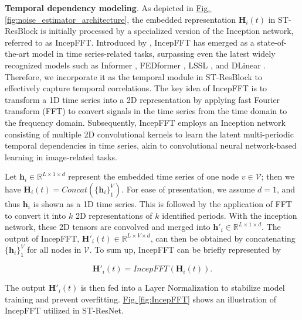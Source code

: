\documentclass[a4paper,fleqn,12pt]{cas-sc}
\begin{document}
\noindent\textbf{Temporal dependency modeling}. As depicted in \hyperref[fig:noise_estimator_architecture]{Fig.\,\ref{fig:noise_estimator_architecture}}, the embedded representation $\boldsymbol{H}_{i}(t)$ in ST-ResBlock is initially processed by a specialized version of the Inception network, referred to as IncepFFT. Introduced by \cite{wu2023timesnet}, IncepFFT has emerged as a state-of-the-art model in time series-related tasks, surpassing even the latest widely recognized models such as Informer \citep{zhou2021informer}, FEDformer \citep{zhou2022fedformer}, LSSL \citep{gu2022efficiently}, and DLinear \citep{zeng2023transformers}. Therefore, we incorporate it as the temporal module in ST-ResBlock to effectively capture temporal correlations. The key idea of IncepFFT is to transform a 1D time series into a 2D representation by applying fast Fourier transform (FFT) to convert signals in the time series from the time domain to the frequency domain. Subsequently, IncepFFT employs an Inception network consisting of multiple 2D convolutional kernels to learn the latent multi-periodic temporal dependencies in time series, akin to convolutional neural network-based learning in image-related tasks.

Let $\boldsymbol{h}_{i}\in\mathbb{R}^{L\times 1\times d}$ represent the embedded time series of one node $v\in \mathcal{V}$; then we have $\boldsymbol{H}_{i}(t) = Concat\left(\{\boldsymbol{h}_{i}\}_{1}^{V}\right)$. For ease of presentation, we assume $d=1$, and thus $\boldsymbol{h}_{i}$ is shown as a 1D time series. This is followed by the application of FFT to convert it into $k$ 2D representations of $k$ identified periods. With the inception network, these 2D tensors are convolved and merged into $\boldsymbol{h}'_{i}\in\mathbb{R}^{L\times 1\times d}$. The output of IncepFFT, $\boldsymbol{H}'_{i}(t)\in\mathbb{R}^{L\times V\times d}$, can then be obtained by concatenating $\{\boldsymbol{h}_{i}\}_{1}^{V}$ for all nodes in $\mathcal{V}$. To sum up, IncepFFT can be briefly represented by
\begin{linenomath*}
\begin{equation}
\boldsymbol{H}'_{i}(t) = \textit{IncepFFT}\left(\boldsymbol{H}_{i}(t)\right).
\end{equation}
\end{linenomath*}
The output $\boldsymbol{H}'_{i}(t)$ is then fed into a Layer Normalization to stabilize model training and prevent overfitting. \hyperref[fig:IncepFFT]{Fig.\,\ref{fig:IncepFFT}} shows an illustration of IncepFFT utilized in ST-ResNet.
\end{document}
